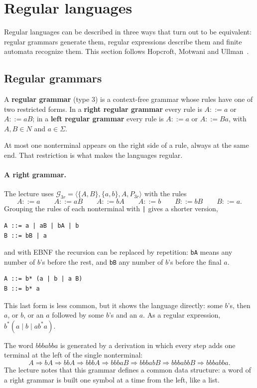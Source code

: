 \section{Regular languages}
\label{sec:regular}

Regular languages can be described in three ways that turn out to be
equivalent: regular grammars generate them, regular expressions describe them
and finite automata recognize them. This section follows Hopcroft, Motwani and
Ullman~\cite[Ch.~3--4]{hopcroft2007automata}.

\subsection{Regular grammars}

\begin{definition}
A \textbf{regular grammar} (type 3) is a context-free grammar whose rules have
one of two restricted forms. In a \textbf{right regular grammar} every rule is
$A ::= a$ or $A ::= aB$; in a \textbf{left regular grammar} every rule is
$A ::= a$ or $A ::= Ba$, with $A, B \in N$ and $a \in \Sigma$.
\end{definition}

At most one nonterminal appears on the right side of a rule, always at the
same end. That restriction is what makes the languages regular.

\paragraph{A right grammar.} The lecture uses
$\mathcal{G}_{3r} = \langle \{A, B\}, \{a, b\}, A, P_{3r} \rangle$ with the rules
\[
A ::= a \qquad A ::= aB \qquad A ::= bA \qquad A ::= b \qquad B ::= bB \qquad B ::= a.
\]
Grouping the rules of each nonterminal with \texttt{|} gives a shorter
version,
\begin{lstlisting}
A ::= a | aB | bA | b
B ::= bB | a
\end{lstlisting}
and with EBNF the recursion can be replaced by repetition: \texttt{bA} means
any number of $b$'s before the rest, and \texttt{bB} any number of $b$'s
before the final $a$.
\begin{lstlisting}
A ::= b* (a | b | a B)
B ::= b* a
\end{lstlisting}
This last form is less common, but it shows the language directly: some
$b$'s, then $a$, or $b$, or an $a$ followed by some $b$'s and an $a$. As a
regular expression, $b^*(a \mid b \mid ab^*a)$.

The word $bbbabba$ is generated by a derivation in which every step adds one
terminal at the left of the single nonterminal:
\[
A \Rightarrow bA \Rightarrow bbA \Rightarrow bbbA \Rightarrow bbbaB \Rightarrow bbbabB
  \Rightarrow bbbabbB \Rightarrow bbbabba.
\]
The lecture notes that this grammar defines a common data structure: a word
of a right grammar is built one symbol at a time from the left, like a list.

